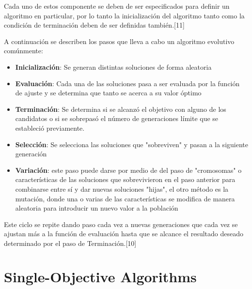 Cada uno de estos componente se deben de ser especificados para definir un algoritmo en particular, por lo tanto la inicialización del algoritmo tanto como la condición de terminación deben de ser definidas también.[11]

A continuación se describen los pasos que lleva a cabo un algoritmo evolutivo comúnmente:

\begin{itemize}
\item \textbf{Inicialización}: Se generan distintas soluciones de forma aleatoria
\item \textbf{Evaluación}: Cada una de las soluciones pasa a ser evaluada por la función de ajuste y se determina que tanto se acerca a su valor óptimo
\item \textbf{Terminación}: Se determina si se alcanzó el objetivo con alguno de los candidatos o si se sobrepasó el número de generaciones límite que se estableció previamente.
\item \textbf{Selección}: Se selecciona las soluciones que "sobreviven" y pasan a la siguiente generación
\item \textbf{Variación}: este paso puede darse por medio de del paso de "cromosomas" o características de las soluciones que sobrevivieron en el paso anterior para combinarse entre sí y dar nuevas soluciones "hijas", el otro método es la mutación, donde una o varias de las características se modifica de manera aleatoria para introducir un nuevo valor a la población
\end{itemize}

Este ciclo se repite dando paso cada vez a nuevas generaciones que cada vez se ajustan más a la función de evaluación hasta que se alcance el resultado deseado determinado por el paso de Terminación.[10] \\

\section{Single-Objective Algorithms}



